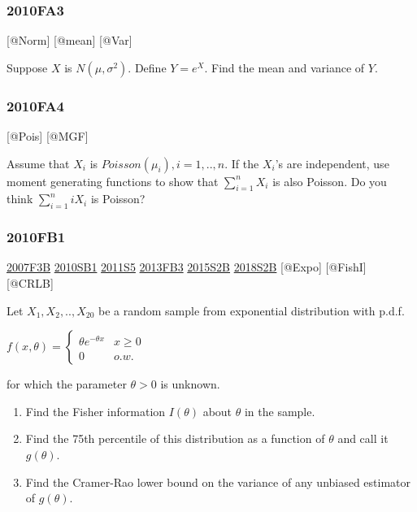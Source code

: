 \documentclass[6pt,Portrait]{article}
\begin{document}
\hypertarget{fa3-1}{%
\subsubsection{2010FA3}\label{fa3-1}}

{[}@Norm{]} {[}@mean{]} {[}@Var{]}

Suppose \(X\) is \(N(\mu,\sigma^2)\). Define \(Y=e^X\). Find the mean
and variance of \(Y\).

\hypertarget{fa4-1}{%
\subsubsection{2010FA4}\label{fa4-1}}

{[}@Pois{]} {[}@MGF{]}

Assume that \(X_i\) is \(Poisson(\mu_i),i=1,..,n\). If the \(X_i\)'s are
independent, use moment generating functions to show that
\(\sum_{i=1}^n X_i\) is also Poisson. Do you think \(\sum_{i=1}^n iX_i\)
is Poisson?

\hypertarget{fb1-1}{%
\subsubsection{2010FB1}\label{fb1-1}}

\protect\hyperlink{f3b}{2007F3B} \protect\hyperlink{sb1-1}{2010SB1}
\protect\hyperlink{s5-2}{2011S5} \protect\hyperlink{fb3-2}{2013FB3}
\protect\hyperlink{s2b-1}{2015S2B} \protect\hyperlink{s2b-2}{2018S2B}
{[}@Expo{]} {[}@FishI{]} {[}@CRLB{]}

Let \(X_1,X_2,..,X_{20}\) be a random sample from exponential
distribution with p.d.f.

\(f(x,\theta)=\begin{cases}\theta e^{-\theta x}& x\ge0\\0& o.w.\end{cases}\)

for which the parameter \(\theta>0\) is unknown.

\begin{enumerate}
\def\labelenumi{(\alph{enumi})}
\item
  Find the Fisher information \(I(\theta)\) about \(\theta\) in the
  sample.
\item
  Find the 75th percentile of this distribution as a function of
  \(\theta\) and call it \(g(\theta)\).
\item
  Find the Cramer-Rao lower bound on the variance of any unbiased
  estimator of \(g(\theta)\).
\end{enumerate}
\end{document}
